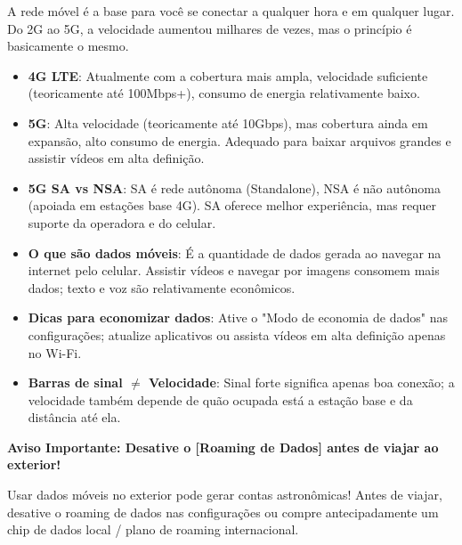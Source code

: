 
A rede móvel é a base para você se conectar a qualquer hora e em qualquer lugar. Do 2G ao 5G, a velocidade aumentou milhares de vezes, mas o princípio é basicamente o mesmo.


\begin{itemize}
  \item \textbf{4G LTE}: Atualmente com a cobertura mais ampla, velocidade suficiente (teoricamente até 100Mbps+), consumo de energia relativamente baixo.
  \item \textbf{5G}: Alta velocidade (teoricamente até 10Gbps), mas cobertura ainda em expansão, alto consumo de energia. Adequado para baixar arquivos grandes e assistir vídeos em alta definição.
  \item \textbf{5G SA vs NSA}: SA é rede autônoma (Standalone), NSA é não autônoma (apoiada em estações base 4G). SA oferece melhor experiência, mas requer suporte da operadora e do celular.
\end{itemize}


\begin{itemize}
  \item \textbf{O que são dados móveis}: É a quantidade de dados gerada ao navegar na internet pelo celular. Assistir vídeos e navegar por imagens consomem mais dados; texto e voz são relativamente econômicos.
  \item \textbf{Dicas para economizar dados}: Ative o "Modo de economia de dados" nas configurações; atualize aplicativos ou assista vídeos em alta definição apenas no Wi-Fi.
  \item \textbf{Barras de sinal $\neq$ Velocidade}: Sinal forte significa apenas boa conexão; a velocidade também depende de quão ocupada está a estação base e da distância até ela.
\end{itemize}

\textbf{Aviso Importante: Desative o [Roaming de Dados] antes de viajar ao exterior!}\par

Usar dados móveis no exterior pode gerar contas astronômicas! Antes de viajar, desative o roaming de dados nas configurações ou compre antecipadamente um chip de dados local / plano de roaming internacional.


